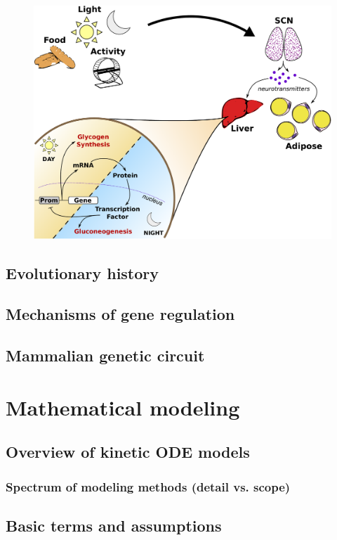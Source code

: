 \begin{figure}
  \centering
  \includegraphics[width=\textwidth]{chap1/figures/timescale_separation.pdf}
  \label{fig:feedforward}
\end{figure}

\subsection{Evolutionary history}\blindtext
\subsection{Mechanisms of gene regulation}\blindtext
\subsection{Mammalian genetic circuit}\blindtext
\section{Mathematical modeling}\blindtext
\subsection{Overview of kinetic ODE models}\blindtext
\subsubsection{Spectrum of modeling methods (detail vs. scope)}\blindtext
\subsection{Basic terms and assumptions}\blindtext

